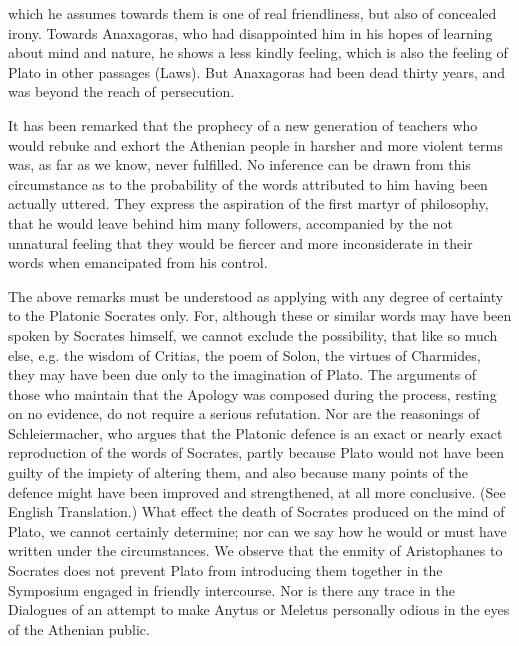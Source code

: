 \documentclass[11pt,letter]{article}
\begin{document}
which he assumes towards them is one of real friendliness, but also of concealed irony. Towards Anaxagoras, who had disappointed him in his hopes of learning about mind and nature, he shows a less kindly feeling, which is also the feeling of Plato in other passages (Laws). But Anaxagoras had been dead thirty years, and was beyond the reach of persecution.

\par  It has been remarked that the prophecy of a new generation of teachers who would rebuke and exhort the Athenian people in harsher and more violent terms was, as far as we know, never fulfilled. No inference can be drawn from this circumstance as to the probability of the words attributed to him having been actually uttered. They express the aspiration of the first martyr of philosophy, that he would leave behind him many followers, accompanied by the not unnatural feeling that they would be fiercer and more inconsiderate in their words when emancipated from his control.

\par  The above remarks must be understood as applying with any degree of certainty to the Platonic Socrates only. For, although these or similar words may have been spoken by Socrates himself, we cannot exclude the possibility, that like so much else, e.g. the wisdom of Critias, the poem of Solon, the virtues of Charmides, they may have been due only to the imagination of Plato. The arguments of those who maintain that the Apology was composed during the process, resting on no evidence, do not require a serious refutation. Nor are the reasonings of Schleiermacher, who argues that the Platonic defence is an exact or nearly exact reproduction of the words of Socrates, partly because Plato would not have been guilty of the impiety of altering them, and also because many points of the defence might have been improved and strengthened, at all more conclusive. (See English Translation.) What effect the death of Socrates produced on the mind of Plato, we cannot certainly determine; nor can we say how he would or must have written under the circumstances. We observe that the enmity of Aristophanes to Socrates does not prevent Plato from introducing them together in the Symposium engaged in friendly intercourse. Nor is there any trace in the Dialogues of an attempt to make Anytus or Meletus personally odious in the eyes of the Athenian public.

\par 
\end{document}

